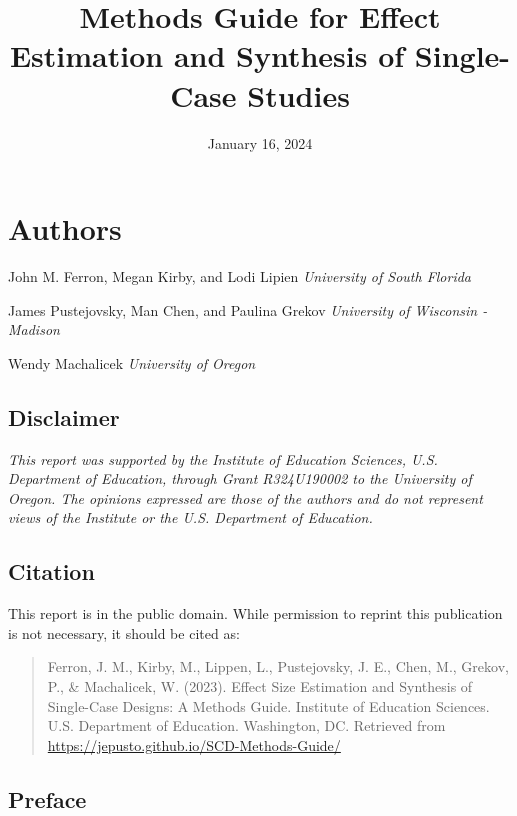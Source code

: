 \documentclass[
]{book}
\title{Methods Guide for Effect Estimation and Synthesis of Single-Case Studies}
\author{}
\date{\vspace{-2.5em}January 16, 2024}
\begin{document}
\maketitle

{
\setcounter{tocdepth}{1}
\tableofcontents
}
\hypertarget{authors}{%
\chapter*{Authors}\label{authors}}

John M. Ferron, Megan Kirby, and Lodi Lipien
\emph{University of South Florida}

James Pustejovsky, Man Chen, and Paulina Grekov
\emph{University of Wisconsin - Madison}

Wendy Machalicek
\emph{University of Oregon}

\hypertarget{disclaimer}{%
\section*{Disclaimer}\label{disclaimer}}

\emph{This report was supported by the Institute of Education Sciences, U.S. Department of Education, through Grant R324U190002 to the University of Oregon. The opinions expressed are those of the authors and do not represent views of the Institute or the U.S. Department of Education.}

\hypertarget{citation}{%
\section*{Citation}\label{citation}}

This report is in the public domain. While permission to reprint this publication is not necessary, it should be cited as:

\begin{quote}
Ferron, J. M., Kirby, M., Lippen, L., Pustejovsky, J. E., Chen, M., Grekov, P., \& Machalicek, W. (2023). Effect Size Estimation and Synthesis of Single-Case Designs: A Methods Guide. Institute of Education Sciences. U.S. Department of Education. Washington, DC. Retrieved from \url{https://jepusto.github.io/SCD-Methods-Guide/}
\end{quote}

\hypertarget{preface}{%
\section*{Preface}\label{preface}}
\end{document}
